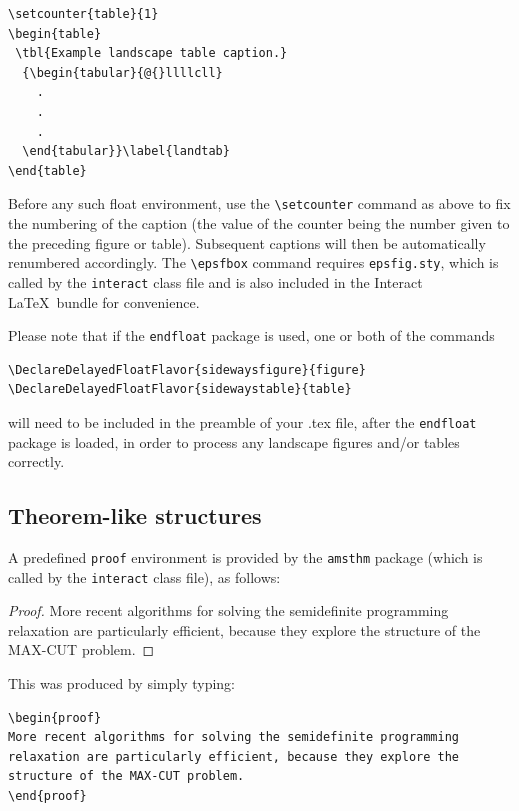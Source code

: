 \documentclass[]{interact}
\theoremstyle{plain}%
\theoremstyle{definition}
\theoremstyle{remark}
\begin{document}
\begin{verbatim}
\setcounter{table}{1}
\begin{table}
 \tbl{Example landscape table caption.}
  {\begin{tabular}{@{}llllcll}
    .
    .
    .
  \end{tabular}}\label{landtab}
\end{table}
\end{verbatim}

Before any such float environment, use the
\texttt{\textbackslash{}setcounter} command as above to fix the
numbering of the caption (the value of the counter being the number
given to the preceding figure or table). Subsequent captions will then
be automatically renumbered accordingly. The
\texttt{\textbackslash{}epsfbox} command requires \texttt{epsfig.sty},
which is called by the \texttt{interact} class file and is also included
in the \textsf{Interact} \LaTeX~bundle for convenience.

Please note that if the \texttt{endfloat} package is used, one or both
of the commands

\begin{verbatim}
\DeclareDelayedFloatFlavor{sidewaysfigure}{figure}
\DeclareDelayedFloatFlavor{sidewaystable}{table}
\end{verbatim}

will need to be included in the preamble of your .tex file, after the
\texttt{endfloat} package is loaded, in order to process any landscape
figures and/or tables correctly.

\hypertarget{theorem-like-structures}{%
\subsection{Theorem-like structures}\label{theorem-like-structures}}

A predefined \texttt{proof} environment is provided by the
\texttt{amsthm} package (which is called by the \texttt{interact} class
file), as follows:

\begin{proof}
More recent algorithms for solving the semidefinite programming relaxation are particularly efficient, because they explore the structure of the MAX-CUT problem.
\end{proof}

\noindent This was produced by simply typing:

\begin{verbatim}
\begin{proof}
More recent algorithms for solving the semidefinite programming
relaxation are particularly efficient, because they explore the
structure of the MAX-CUT problem.
\end{proof}
\end{verbatim}
\end{document}
